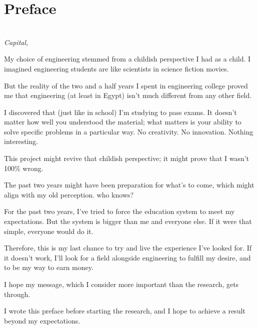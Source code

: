 \chapter*{Preface}

\begin{flushright}
{\makeatletter\itshape
    \@author \\
    Capital, \monthname{} \the\year{}
\makeatother}
\end{flushright}

My choice of engineering stemmed from a childish perspective I had as a child. I imagined engineering students are like scientists in science fiction movies.

But the reality of the two and a half years I spent in engineering college proved me that engineering (at least in Egypt) isn't much different from any other field.

I discovered that (just like in school) I'm studying to pass exams. It doesn't matter how well you understood the material; what matters is your ability to solve specific problems in a particular way. No creativity. No innovation. Nothing interesting.

This project might revive that childish perspective; it might prove that I wasn't 100\% wrong.

The past two years might have been preparation for what's to come, which might align with my old perception. who knows?

For the past two years, I've tried to force the education system to meet my expectations. But the system is bigger than me and everyone else. If it were that simple, everyone would do it.

Therefore, this is my last chance to try and live the experience I've looked for. If it doesn't work, I'll look for a field alongside engineering to fulfill my desire, and to be my way to earn money.

I hope my message, which I consider more important than the research, gets through.

I wrote this preface before starting the research, and I hope to achieve a result beyond my expectations.